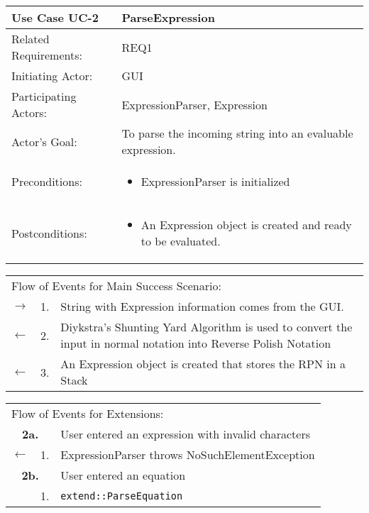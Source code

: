 \documentclass[11pt,letterpaper]{article}
\newcommand{\code}[1]{\texttt{#1}}
\begin{document}
\newpage

\begin{center}
\begin{tabular}{p{1.5in}p{5in}}
\hline
\textbf{Use Case UC-2}     & \textbf{ParseExpression} \\ \hline
Related Requirements: & REQ1 \\
Initiating Actor:     & GUI \\
Participating Actors: & ExpressionParser, Expression \\
Actor's Goal:          & To parse the incoming string into an evaluable expression. \\
Preconditions:         & \begin{itemize}[nosep]
		      \item  ExpressionParser is initialized
                         \end{itemize} \\
Postconditions:        & \begin{itemize}[nosep]
                         \item An Expression object is created and ready to be evaluated.
                         \end{itemize} \\ \hline
\end{tabular}

\begin{tabular}{p{.25in}p{.25in}p{5.8in}}
\multicolumn{3}{l}{Flow of Events for Main Success Scenario:} \\
$\rightarrow$ & 1. & String with Expression information comes from the GUI. \\
$\leftarrow$  & 2. & Diykstra's Shunting Yard Algorithm is used to convert the input in normal notation into Reverse Polish Notation\\
$\leftarrow$  & 3. & An Expression object is created that stores the  RPN in a Stack \\
\end{tabular}

\begin{tabular}{p{.25in}p{.25in}p{5.8in}}
\multicolumn{3}{l}{Flow of Events for Extensions:} \\
\multicolumn{2}{c}{\textbf{2a.}} & User entered an expression with invalid characters \\
$\leftarrow$  & 1.           & ExpressionParser throws NoSuchElementException\\

\multicolumn{2}{c}{\textbf{2b.}} & User entered an equation\\
 & 1.           & \code{extend::ParseEquation}\\

\end{tabular}
\end{center}
\end{document}
